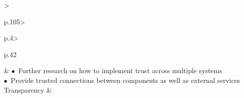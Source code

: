 \begin{table}[t]
\begin{small}
\begin{supertabular}{%
		>{\raggedright}p{.105\textwidth}>{\raggedright}p{.4\textwidth}>{\raggedright}p{.42\textwidth}}
			& \vspace{.1cm}
				\noindent $\bullet$~Further research on how to implement trust across multiple systems \\
				\noindent $\bullet$~Provide trusted connections between components as well as external services \vspace{.2cm} %
 			 \tabularnewline \hline %
			\vspace{.1cm}Transparency & \vspace{.1cm}
				

\end{supertabular}
\end{small}
\end{table}
